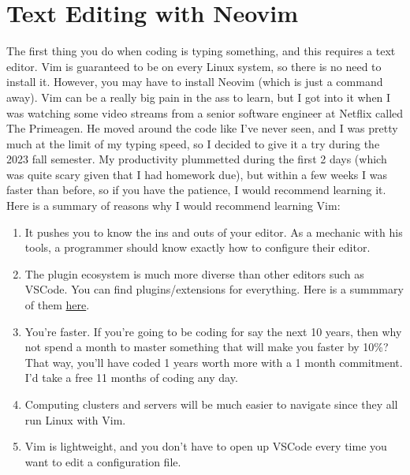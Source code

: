 \section{Text Editing with Neovim} 

  The first thing you do when coding is typing something, and this requires a text editor. Vim is guaranteed to be on every Linux system, so there is no need to install it. However, you may have to install Neovim (which is just a command away). Vim can be a really big pain in the ass to learn, but I got into it when I was watching some video streams from a senior software engineer at Netflix called The Primeagen. He moved around the code like I've never seen, and I was pretty much at the limit of my typing speed, so I decided to give it a try during the 2023 fall semester. My productivity plummetted during the first 2 days (which was quite scary given that I had homework due), but within a few weeks I was faster than before, so if you have the patience, I would recommend learning it. Here is a summary of reasons why I would recommend learning Vim: 
  \begin{enumerate}
    \item It pushes you to know the ins and outs of your editor. As a mechanic with his tools, a programmer should know exactly how to configure their editor.  
    \item The plugin ecosystem is much more diverse than other editors such as VSCode. You can find plugins/extensions for everything. Here is a summmary of them \href{https://github.com/rockerBOO/awesome-neovim\#neovim-lua-development}{here}. 
    \item You're faster. If you're going to be coding for say the next 10 years, then why not spend a month to master something that will make you faster by 10\%? That way, you'll have coded 1 years worth more with a 1 month commitment. I'd take a free 11 months of coding any day. 
    \item Computing clusters and servers will be much easier to navigate since they all run Linux with Vim. 
    \item Vim is lightweight, and you don't have to open up VSCode every time you want to edit a configuration file.  
  \end{enumerate}


